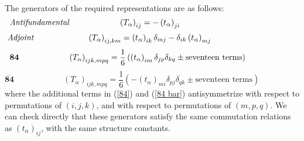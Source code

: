 \documentclass[a4paper,12pt,oneside]{article}
\begin{document}
The generators of the required representations are as follows:
\begin{equation}\label{Antifundamental}
\textrm{\emph{Antifundamental}}\qquad\qquad\qquad
\left(T_\alpha\right)_{ij}=-\left(t_\alpha\right)_{ji}
\qquad\qquad\qquad\qquad\qquad\qquad\qquad
\end{equation}
\begin{equation}\label{Adjoint}
\textrm{\emph{Adjoint}}\qquad\qquad\qquad\:\;
\left(T_\alpha\right)_{ij,km}=\left(t_\alpha\right)_{ik}\delta_{mj}
-\delta_{ik}\left(t_\alpha\right)_{mj}
\qquad\qquad\qquad\qquad\qquad\:\;
\end{equation}
\begin{equation}\label{84}
\textrm{\textbf{84}}\qquad\qquad\qquad
\left(T_\alpha\right)_{ijk,mpq}=\frac{1}{6}\left(\left(t_\alpha
\right)_{im}\delta_{jp}\delta_{kq}\pm\textrm{seventeen terms}\right)
\qquad\qquad\qquad
\end{equation}
\begin{equation}\label{84 bar}
\mathbf{\overline{84}}\qquad\qquad\qquad
\left(T_\alpha\right)_{ijk,mpq}=\frac{1}{6}\left(-\left(t_\alpha
\right)_{mi}\delta_{pj}\delta_{qk}\pm\textrm{seventeen terms}\right)
\qquad\qquad\qquad
\end{equation}
where the additional terms in (\ref{84}) and (\ref{84 bar}) 
antisymmetrize with respect to permutations of $(i,j,k)$, and with
respect to permutations of $(m,p,q)$.  We can check directly that
these generators satisfy the same commutation relations as
$\left(t_\alpha\right)_{ij}$, with the same structure constants.
\end{document}
